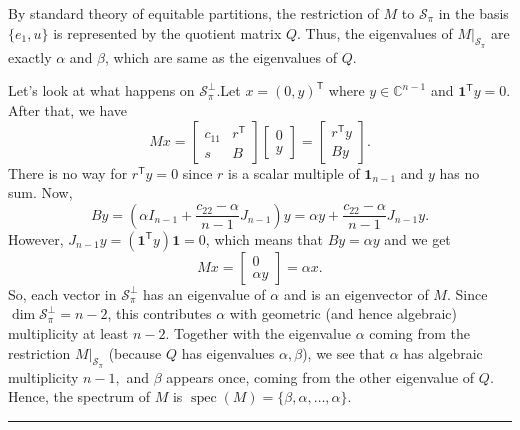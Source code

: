 \documentclass[12pt,twoside]{article}
\renewenvironment{proof}{{\noindent\bfseries Proof.}}{\qed}
\def\qed{\nolinebreak\hfill\rule{.2cm}{.2cm}\par\addvspace{.5cm}}
\begin{document}
\begin{proof}
	\smallskip
	By standard theory of equitable partitions, the restriction of $M$ to $\mathcal{S}_\pi$ in the basis $\{e_1,u\}$ is represented by the quotient matrix $Q$. Thus, the eigenvalues of $M|_{\mathcal{S}_\pi}$ are exactly $\alpha$ and $\beta$, which are same as the eigenvalues of $Q$.
	
	Let's look at what happens on $\mathcal{S}_\pi^\perp$.Let $x=(0,y)^\mathsf{T}$ where $y\in\mathbb{C}^{n-1}$ and $\mathbf{1}^\mathsf{T}y=0$. After that, we have
	$$
	Mx
	=
	\begin{bmatrix}
		c_{11} & r^\mathsf{T}\\
		s & B
	\end{bmatrix}
	\begin{bmatrix}0\\y\end{bmatrix}
	=
	\begin{bmatrix}
		r^\mathsf{T}y\\
		By
	\end{bmatrix}.
	$$
	There is no way for $r^\mathsf{T}y=0$ since $r$ is a scalar multiple of $\mathbf{1}_{n-1}$ and $y$ has no sum. Now,
	$$
	By
	=
	\left(\alpha I_{n-1} + \frac{c_{22}-\alpha}{\,n-1\,}J_{n-1}\right)y
	=
	\alpha y + \frac{c_{22}-\alpha}{\,n-1\,} J_{n-1}y.
	$$
	However, $J_{n-1}y = (\mathbf{1}^\mathsf{T}y)\mathbf{1}=0$, which means that $By=\alpha y$ and we get
	$$
	Mx = \begin{bmatrix}0\\ \alpha y\end{bmatrix} = \alpha x.
	$$
	So, each vector in $\mathcal{S}_\pi^\perp$ has an eigenvalue of $\alpha$ and is an eigenvector of $M$. Since $\dim\mathcal{S}_\pi^\perp = n-2$, this contributes $\alpha$ with geometric (and hence algebraic) multiplicity at least $n-2$. Together with the eigenvalue $\alpha$ coming from the restriction $M|_{\mathcal{S}_\pi}$ (because $Q$ has eigenvalues $\alpha,\beta$), we see that $\alpha$  has algebraic multiplicity $n-1,$	and $\beta$ appears once, coming from the other eigenvalue of $Q$. Hence, the spectrum of $M$ is  $\operatorname{spec}(M)=\{\beta,\alpha,\dots,\alpha\}.$
	

\end{proof}
\end{document}
